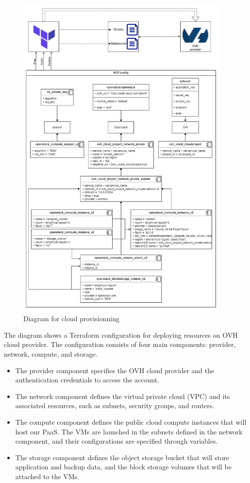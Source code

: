 \begin{figure}[H]\centering
\includegraphics[width=0.95\textwidth]{assets/f14.png}
\caption{Diagram for cloud provisionning}
\label{fig:fig14}
\end{figure}

The diagram shows a Terraform configuration for deploying resources on OVH cloud provider. The configuration consists of four main components: provider, network, compute, and storage. 

\begin{itemize}[label={--}]
\item The provider component specifies the OVH cloud provider and the authentication credentials to access the account. 
\item The network component defines the virtual private cloud (VPC) and its associated resources, such as subnets, security groups, and routers. 
\item The compute component defines the public cloud compute instances that will host our PaaS. The VMs are launched in the subnets defined in the network component, and their configurations are specified through variables. 
\item The storage component defines the object storage bucket that will store application and backup data, and the block storage volumes that will be attached to the VMs. 
\end{itemize}

